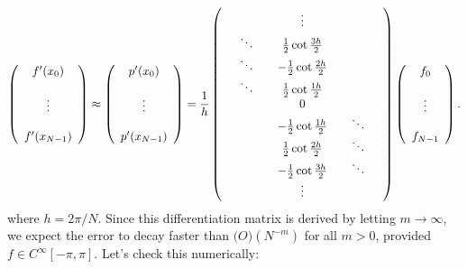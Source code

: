 \documentclass[12pt,a4paper]{article}
\begin{document}
\[
\left(
\begin{array}{c c c c c}
f'(x_0) \\
  \\
\vdots  \\
  \\
f'(x_{N-1})
\end{array}
\right) \approx 
\left(
\begin{array}{c c c c c}
p'(x_0) \\
  \\
\vdots  \\
  \\
p'(x_{N-1})
\end{array}
\right) = \frac{1}{h}
\left(
\begin{array}{c c c c c c c}
  &       &       & \vdots  &   &   & \\
  &\ddots &       & \frac{1}{2}\cot \frac{3h}{2}   &   &    &  \\
   &\ddots &      &-\frac{1}{2}\cot \frac{2h}{2}   &   &    &  \\ 
   &\ddots &      & \frac{1}{2}\cot \frac{1h}{2}   &   &    &   \\
  &        &      & 0                              &   &    &   \\
&      &      & -\frac{1}{2}\cot \frac{1h}{2}   &   &   \ddots &  \\
&      &      & \frac{1}{2}\cot \frac{2h}{2}   &   &   \ddots &  \\
&      &      & -\frac{1}{2}\cot \frac{3h}{2}   &   &   \ddots &  \\
&      &      & \ensuremath{\vdots}  &   &    &  \\

\end{array}
\right)
\left(
\begin{array}{c c c c c}
f_0 \\
  \\
\vdots  \\
  \\
f_{N-1}
\end{array}
\right).
\]
where $h = 2\pi/N$.   Since this differentiation matrix is derived by letting $m \to \infty$, we expect the error to decay faster than $\mathcal(O)(N^{-m})$ for all $m > 0$, provided $f \in C^{\infty}[-\pi, \pi]$.  Let's check this numerically:
\end{document}
